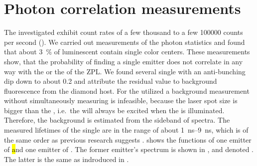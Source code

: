 



	\section{Photon correlation measurements} \label{subsec::g2}

		The investigated \sivs exhibit count rates of a few thousand to a few \num{100000} counts per second (\SI{}{\cps}).
		We carried out measurements of the photon statistics and found that about \SI{3}{\percent} of luminescent \nds contain single color centers.
		These measurements show, that the probability of finding a single emitter does not correlate in any way with the \cwl or the \lw of the ZPL.
		We found several single \sivs with an anti-bunching dip down to about \num{0.2} and attribute the residual \gtz value to background fluorescence from the diamond host.
		For the utilized \nds a background measurement without simultaneously measuring \siv \pl is infeasible, because the laser spot size is bigger than the \nd, i.e.\ the \siv will always be excited when the \nd is illuminated.
		Therefore, the background is estimated from the sideband of \siv spectra.
		The measured lifetimes of the single \sivs are in the range of about \SIrange{1}{9}{\ns}, which is of the same order as previous research suggests \cite{Sipahigil2014,Sternschulte1994}.
		 shows the \gt functions of one emitter of \hl and one emitter of \vl.
		The former emitter's spectrum is shown in , and denoted \emhtwo. The latter is the same as \embroad indroduced in .

